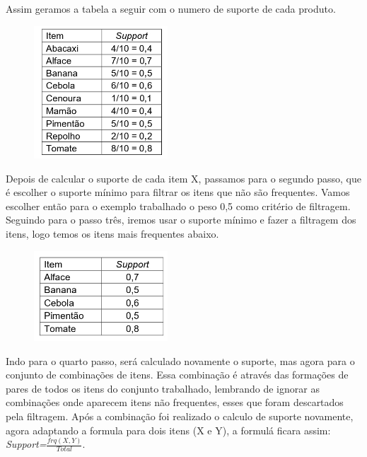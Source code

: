 \documentclass[tcc1]{uftex}
\begin{document}
Assim geramos a tabela a seguir com o numero de suporte de cada produto. 
    \begin{figure}[h]
    \centering
    \includegraphics[width=5cm]{passo_1.jpg}
    \end{figure}

Depois de calcular o suporte de cada item X, passamos para o segundo passo, que é escolher o suporte mínimo para filtrar os itens que não são frequentes. Vamos escolher então para o exemplo trabalhado o peso 0,5 como critério de filtragem. Seguindo para o passo três, iremos usar o suporte mínimo e fazer a filtragem dos itens, logo temos os itens mais frequentes abaixo.
    \begin{figure}[h]
    \centering
    \includegraphics[width=5cm]{passo_2.jpg}
    \end{figure}

Indo para o quarto passo, será calculado novamente o suporte, mas agora para o conjunto de combinações de itens. Essa combinação é através das formações de pares de todos os itens do conjunto trabalhado, lembrando de ignorar as combinações onde aparecem itens não frequentes, esses que foram descartados pela filtragem. Após a combinação foi realizado o calculo de suporte novamente, agora adaptando a formula para dois itens (X e Y), a formulá ficara assim:  \textit{Support=}${\frac{frq(X,Y)}{Total}}$.
\end{document}
